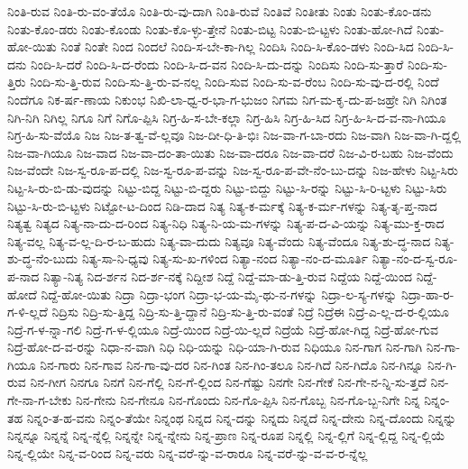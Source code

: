 {ನಿಂತಿ-ರುವ
ನಿಂತಿ-ರು-ವಂ-ತೆಯೊ
ನಿಂತಿ-ರು-ವು-ದಾಗಿ
ನಿಂತಿ-ರುವೆ
ನಿಂತಿವೆ
ನಿಂತೀತು
ನಿಂತು
ನಿಂತು-ಕೊಂ-ಡನು
ನಿಂತು-ಕೊಂ-ಡರು
ನಿಂತು-ಕೊಂಡು
ನಿಂತು-ಕೊ-ಳ್ಳು-ತ್ತೇನೆ
ನಿಂತು-ಬಿಟ್ಟ
ನಿಂತು-ಬಿ-ಟ್ಟಳು
ನಿಂತು-ಹೋ-ಗಿದೆ
ನಿಂತು-ಹೋ-ಯಿತು
ನಿಂತೆ
ನಿಂತೇ
ನಿಂದ
ನಿಂದಲೆ
ನಿಂದಿ-ಸ-ಬೇ-ಕಾ-ಗಿಲ್ಲ
ನಿಂದಿಸಿ
ನಿಂದಿ-ಸಿ-ಕೊಂ-ಡಳು
ನಿಂದಿ-ಸಿದ
ನಿಂದಿ-ಸಿ-ದನು
ನಿಂದಿ-ಸಿ-ದರೆ
ನಿಂದಿ-ಸಿ-ದ-ರೆಂದು
ನಿಂದಿ-ಸಿ-ದ-ವನ
ನಿಂದಿ-ಸಿ-ದು-ದನ್ನು
ನಿಂದಿಸು
ನಿಂದಿ-ಸು-ತ್ತಾರೆ
ನಿಂದಿ-ಸು-ತ್ತಿರು
ನಿಂದಿ-ಸು-ತ್ತಿ-ರುವ
ನಿಂದಿ-ಸು-ತ್ತಿ-ರು-ವ-ನಲ್ಲ
ನಿಂದಿ-ಸುವ
ನಿಂದಿ-ಸು-ವ-ರೆಂಬ
ನಿಂದಿ-ಸು-ವು-ದ-ರಲ್ಲಿ
ನಿಂದೆ
ನಿಂದೆಗೂ
ನಿಕ-ರ್ಷ-ಣಾಯ
ನಿಕುಂಭ
ನಿಖಿ-ಲಾ-ಧ್ವ-ರ-ಭಾ-ಗ-ಭುಜಂ
ನಿಗಮ
ನಿಗ-ಮ-ಕೃ-ದು-ಪ-ಜಹ್ರೇ
ನಿಗಿ
ನಿಗಿಂತ
ನಿಗಿ-ನಿಗಿ
ನಿಗಿಲ್ಲ
ನಿಗೂ
ನಿಗೆ
ನಿಗೊ-ಪ್ಪಿಸಿ
ನಿಗ್ರ-ಹಿ-ಸ-ಬೇ-ಕಲ್ಲಾ
ನಿಗ್ರ-ಹಿಸಿ
ನಿಗ್ರ-ಹಿ-ಸಿದ
ನಿಗ್ರ-ಹಿ-ಸಿ-ದ-ವ-ನಾ-ಗಿಯೂ
ನಿಗ್ರ-ಹಿ-ಸು-ವೆಯೊ
ನಿಜ
ನಿಜ-ತ-ತ್ವ-ವೆ-ಲ್ಲವೂ
ನಿಜ-ದೀ-ಧಿ-ತಿ-ಭಿಃ
ನಿಜ-ವಾ-ಗ-ಬಾ-ರದು
ನಿಜ-ವಾಗಿ
ನಿಜ-ವಾ-ಗಿ-ದ್ದಲ್ಲಿ
ನಿಜ-ವಾ-ಗಿಯೂ
ನಿಜ-ವಾದ
ನಿಜ-ವಾ-ದಂ-ತಾ-ಯಿತು
ನಿಜ-ವಾ-ದರೂ
ನಿಜ-ವಾ-ದರೆ
ನಿಜ-ವಿ-ರ-ಬಹು
ನಿಜ-ವೆಂದು
ನಿಜ-ವೆಂದೇ
ನಿಜ-ಸ್ವ-ರೂ-ಪ-ದಲ್ಲಿ
ನಿಜ-ಸ್ವ-ರೂ-ಪ-ವನ್ನು
ನಿಜ-ಸ್ವ-ರೂ-ಪ-ವೇ-ನೆಂ-ಬು-ದನ್ನು
ನಿಜ-ಹೇಳು
ನಿಟ್ಟ-ಸಿರು
ನಿಟ್ಟ-ಸಿ-ರು-ಬಿ-ಡು-ವುದನ್ನು
ನಿಟ್ಟು-ಬಿದ್ದ
ನಿಟ್ಟು-ಬಿ-ದ್ದರು
ನಿಟ್ಟು-ಬಿದ್ದು
ನಿಟ್ಟು-ಸಿ-ರನ್ನು
ನಿಟ್ಟು-ಸಿ-ರಿ-ಟ್ಟಳು
ನಿಟ್ಟು-ಸಿರು
ನಿಟ್ಟು-ಸಿ-ರು-ಬಿ-ಟ್ಟಳು
ನಿಟ್ಟೋ-ಟ-ದಿಂದ
ನಿಡಿ-ದಾದ
ನಿತ್ಯ
ನಿತ್ಯ-ಕ-ರ್ಮಕ್ಕೆ
ನಿತ್ಯ-ಕ-ರ್ಮ-ಗಳನ್ನು
ನಿತ್ಯ-ತೃ-ಪ್ತ-ನಾದ
ನಿತ್ಯತ್ವ
ನಿತ್ಯದ
ನಿತ್ಯ-ನಾ-ದು-ದ-ರಿಂದ
ನಿತ್ಯ-ನಿಧಿ
ನಿತ್ಯ-ನಿ-ಯ-ಮ-ಗಳನ್ನು
ನಿತ್ಯ-ಪ-ದ-ವಿ-ಯನ್ನು
ನಿತ್ಯ-ಮು-ಕ್ತ-ರಾದ
ನಿತ್ಯ-ವಲ್ಲ
ನಿತ್ಯ-ವ-ಲ್ಲ-ದಿ-ರ-ಬ-ಹುದು
ನಿತ್ಯ-ವಾ-ದುದು
ನಿತ್ಯವೂ
ನಿತ್ಯ-ವೆಂದು
ನಿತ್ಯ-ವೆಂದೂ
ನಿತ್ಯ-ಶು-ದ್ಧ-ನಾದ
ನಿತ್ಯ-ಶು-ದ್ಧ-ನೆಂ-ಬುದು
ನಿತ್ಯ-ಸಾ-ನಿ-ಧ್ಯವು
ನಿತ್ಯ-ಸು-ಖ-ಗಳಿಂದ
ನಿತ್ಯಾ-ನಂದ
ನಿತ್ಯಾ-ನಂ-ದ-ಮೂರ್ತಿ
ನಿತ್ಯಾ-ನಂ-ದ-ಸ್ವ-ರೂ-ಪ-ನಾದ
ನಿತ್ಯಾ-ನಿತ್ಯ
ನಿದ-ರ್ಶನ
ನಿದ-ರ್ಶ-ನಕ್ಕೆ
ನಿದ್ದೀಶ
ನಿದ್ದೆ
ನಿದ್ದೆ-ಮಾ-ಡು-ತ್ತಿ-ರುವ
ನಿದ್ದೆಯ
ನಿದ್ದೆ-ಯಿಂದ
ನಿದ್ದೆ-ಹೋದೆ
ನಿದ್ದೆ-ಹೋ-ಯಿತು
ನಿದ್ರಾ
ನಿದ್ರಾ-ಭಂಗ
ನಿದ್ರಾ-ಭ-ಯ-ಮೈ-ಥು-ನ-ಗಳನ್ನು
ನಿದ್ರಾ-ಲ-ಸ್ಯ-ಗಳನ್ನು
ನಿದ್ರಾ-ಹಾ-ರ-ಗ-ಳಿ-ಲ್ಲದೆ
ನಿದ್ರಿಸು
ನಿದ್ರಿ-ಸು-ತ್ತಿದ್ದ
ನಿದ್ರಿ-ಸು-ತ್ತಿ-ದ್ದಾನೆ
ನಿದ್ರಿ-ಸು-ತ್ತಿ-ರು-ವಂತೆ
ನಿದ್ರೆ
ನಿದ್ರೆಈ
ನಿದ್ರೆ-ಎ-ಲ್ಲ-ದ-ರ-ಲ್ಲಿಯೂ
ನಿದ್ರೆ-ಗ-ಳ-ನ್ನಾ-ಗಲಿ
ನಿದ್ರೆ-ಗ-ಳ-ಲ್ಲಿಯೂ
ನಿದ್ರೆ-ಯಿಂದ
ನಿದ್ರೆ-ಯಿ-ಲ್ಲದೆ
ನಿದ್ರೆಯೆ
ನಿದ್ರೆ-ಹೋ-ಗಿದ್ದ
ನಿದ್ರೆ-ಹೋ-ಗುವ
ನಿದ್ರೆ-ಹೋ-ದ-ವ-ರನ್ನು
ನಿಧಾ-ನ-ವಾಗಿ
ನಿಧಿ
ನಿಧಿ-ಯನ್ನು
ನಿಧಿ-ಯಾ-ಗಿ-ರುವ
ನಿಧಿಯೂ
ನಿನ-ಗಾಗ
ನಿನ-ಗಾಗಿ
ನಿನ-ಗಾ-ಗಿಯೂ
ನಿನ-ಗಾರು
ನಿನ-ಗಾವ
ನಿನ-ಗಾ-ವು-ದರ
ನಿನ-ಗಿಂತ
ನಿನ-ಗಿಂ-ತಲೂ
ನಿನ-ಗಿದೆ
ನಿನ-ಗಿದೊ
ನಿನ-ಗಿನ್ನೂ
ನಿನ-ಗಿ-ರುವ
ನಿನ-ಗೀಗ
ನಿನಗೂ
ನಿನಗೆ
ನಿನ-ಗೆಲ್ಲಿ
ನಿನ-ಗೆ-ಲ್ಲಿಂದ
ನಿನ-ಗೆಷ್ಟು
ನಿನಗೇ
ನಿನ-ಗೇಕೆ
ನಿನ-ಗೇ-ನ-ನ್ನಿ-ಸು-ತ್ತದೆ
ನಿನ-ಗೇ-ನಾ-ಗ-ಬೇಕು
ನಿನ-ಗೇನು
ನಿನ-ಗೇನೂ
ನಿನ-ಗೊಂದು
ನಿನ-ಗೊ-ಪ್ಪಿಸಿ
ನಿನ-ಗೊಬ್ಬ
ನಿನ-ಗೊ-ಬ್ಬ-ನಿಗೇ
ನಿನ್ನ
ನಿನ್ನಂ-ತಹ
ನಿನ್ನಂ-ತ-ಹ-ವನು
ನಿನ್ನಂ-ತೆಯೇ
ನಿನ್ನಂಥ
ನಿನ್ನದ
ನಿನ್ನ-ದನ್ನು
ನಿನ್ನದು
ನಿನ್ನದೆ
ನಿನ್ನ-ದೇನು
ನಿನ್ನ-ದೊಂದು
ನಿನ್ನನ್ನು
ನಿನ್ನನ್ನೂ
ನಿನ್ನನ್ನೆ
ನಿನ್ನ-ನ್ನೆಲ್ಲಿ
ನಿನ್ನನ್ನೇ
ನಿನ್ನ-ನ್ನೇನು
ನಿನ್ನ-ಪ್ರಾಣ
ನಿನ್ನ-ರೂಪ
ನಿನ್ನಲ್ಲಿ
ನಿನ್ನ-ಲ್ಲಿಗೆ
ನಿನ್ನ-ಲ್ಲಿದ್ದ
ನಿನ್ನ-ಲ್ಲಿಯೆ
ನಿನ್ನ-ಲ್ಲಿಯೇ
ನಿನ್ನ-ವ-ರಿಂದ
ನಿನ್ನ-ವರು
ನಿನ್ನ-ವರೆ-ನ್ನು-ವ-ರಾರೂ
ನಿನ್ನ-ವರೆ-ನ್ನು-ವ-ವ-ರ-ನ್ನೆಲ್ಲ
}
